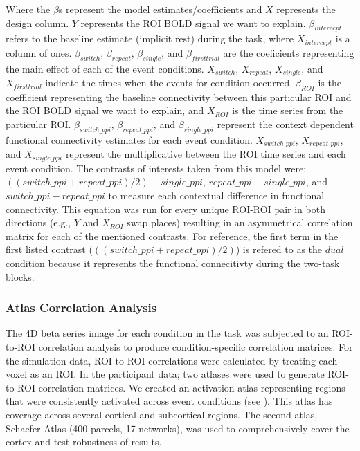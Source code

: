 \documentclass[phd,appendix,figures]{uithesis}
\begin{document}
Where the $\beta$s represent the model estimates/coefficients and $X$ represents
the design column.
$Y$ represents the ROI BOLD signal we want to explain.
$\beta_{intercept}$ refers to the baseline estimate (implicit rest) during the task,
where $X_{intercept}$ is a column of ones.
$\beta_{switch}$, $\beta_{repeat}$, $\beta_{single}$, and $\beta_{firsttrial}$
are the coeficients representing the main effect of each of the event conditions.
$X_{switch}$, $X_{repeat}$, $X_{single}$, and $X_{firsttrial}$ indicate the
times when the events for condition occurred.
$\beta_{ROI}$ is the coefficient representing the baseline connectivity between
this particular ROI and the ROI BOLD signal we want to explain, and
$X_{ROI}$ is the time series from the particular ROI.
$\beta_{switch\_ppi}$, $\beta_{repeat\_ppi}$, and $\beta_{single\_ppi}$
represent the context dependent functional connectivity estimates for
each event condition.
$X_{switch\_ppi}$, $X_{repeat\_ppi}$, and $X_{single\_ppi}$ represent
the multiplicative between the ROI time series and each event condition.
The contrasts of interests taken from this model were:
$((switch\_ppi + repeat\_ppi) / 2) - single\_ppi$, $repeat\_ppi - single\_ppi$,
and $switch\_ppi - repeat\_ppi$ to measure each contextual difference in functional connectivity. 
This equation was run for every unique ROI-ROI pair in both directions
(e.g., $Y$ and $X_{ROI}$ swap places) resulting in an
asymmetrical correlation matrix for each of the mentioned contrasts.
For reference, the first term in the first listed contrast ($((switch\_ppi + repeat\_ppi) / 2)$)
is refered to as the $dual$ condition because it represents the functional connecitivty during the
two-task blocks.

\subsubsection*{Atlas Correlation Analysis}
\label{methods:atlas-corr-analysis2}

The 4D beta series image for each condition in the task was subjected to
an ROI-to-ROI correlation analysis
to produce condition-specific correlation matrices.
For the simulation data, ROI-to-ROI correlations were calculated by
treating each voxel as an ROI.
In the participant data; two atlases were used to generate ROI-to-ROI correlation matrices.
We created an activation atlas representing regions that were
consistently activated across event conditions (see ).
This atlas has coverage across several cortical and subcortical regions.
The second atlas, Schaefer Atlas (400 parcels, 17 networks)\cite{Schaefer2017}, was
used to comprehensively cover the cortex and test robustness of results.
\end{document}
